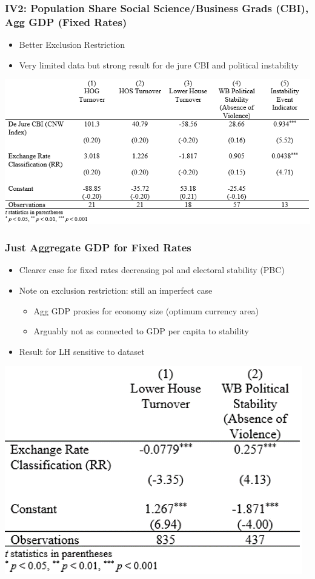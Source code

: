 \documentclass[]{beamer}
\begin{document}
\begin{frame}
    \frametitle{IV2: Population Share Social Science/Business Grads (CBI), Agg GDP (Fixed Rates)}
    \begin{itemize}
        \item Better Exclusion Restriction
        \item Very limited data but strong result for de jure CBI and political instability
    \end{itemize}
    \includegraphics{img0007.png}
\end{frame}


\begin{frame}
    \frametitle{Just Aggregate GDP for Fixed Rates}
    \begin{itemize}
        \item Clearer case for fixed rates decreasing pol and electoral stability (PBC)
        \item Note on exclusion restriction: still an imperfect case
        \begin{itemize}
            \item Agg GDP proxies for economy size (optimum currency area)
            \item Arguably not as connected to GDP per capita to stability
        \end{itemize}
        \item Result for LH sensitive to dataset
    \end{itemize}
    \includegraphics{img0008.png}
\end{frame}
\end{document}
